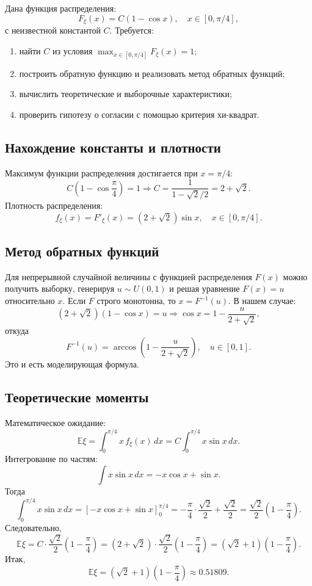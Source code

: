 \documentclass[bachelor, och, pract3]{SCWorks}
\begin{document}
Дана функция распределения:
\[
F_\xi(x) = C(1-\cos x), \quad x \in [0, \pi/4],
\]
с неизвестной константой $C$. Требуется:
\begin{enumerate}
    \item найти $C$ из условия $\max_{x \in [0, \pi/4]} F_\xi(x)=1$;
    \item построить обратную функцию и реализовать метод обратных функций;
    \item вычислить теоретические и выборочные характеристики;
    \item проверить гипотезу о согласии с помощью критерия хи-квадрат.
\end{enumerate}

\subsection{Нахождение константы и плотности}

Максимум функции распределения достигается при $x = \pi/4$:
\[
C\left(1-\cos\frac{\pi}{4}\right)=1 \Rightarrow C = \frac{1}{1-\sqrt{2}/2} = 2+\sqrt{2}.
\]
Плотность распределения:
\[
f_\xi(x) = F'_\xi(x) = (2+\sqrt{2})\sin x, \quad x\in[0,\pi/4].
\]

\subsection{Метод обратных функций}

Для непрерывной случайной величины с функцией распределения $F(x)$ можно получить выборку, генерируя $u\sim U(0,1)$ и решая уравнение $F(x)=u$ относительно $x$. Если $F$ строго монотонна, то $x = F^{-1}(u)$. В нашем случае:
\[
(2+\sqrt{2})(1-\cos x) = u \Rightarrow \cos x = 1 - \frac{u}{2+\sqrt{2}},
\]
откуда
\[
F^{-1}(u) = \arccos\left(1 - \frac{u}{2+\sqrt{2}}\right), \quad u\in[0,1].
\]
Это и есть моделирующая формула.

\subsection{Теоретические моменты}
Математическое ожидание:
\[
\mathbb E\xi=\int_0^{\pi/4} x\, f_\xi(x)\,dx
= C\int_0^{\pi/4} x\sin x\,dx.
\]
Интегрование по частям:
\[
\int x\sin x\,dx = -x\cos x+\sin x.
\]
Тогда
\[
\int_0^{\pi/4} x\sin x\,dx
= \left[-x\cos x+\sin x\right]_0^{\pi/4}
= -\frac{\pi}{4}\cdot\frac{\sqrt2}{2}+\frac{\sqrt2}{2}
= \frac{\sqrt2}{2}\left(1-\frac{\pi}{4}\right).
\]
Следовательно,
\[
\mathbb E\xi
= C\cdot \frac{\sqrt2}{2}\left(1-\frac{\pi}{4}\right)
= (2+\sqrt2)\cdot\frac{\sqrt2}{2}\left(1-\frac{\pi}{4}\right)
= (\sqrt2+1)\left(1-\frac{\pi}{4}\right).
\]
Итак,
\[
\mathbb E\xi=(\sqrt2+1)\left(1-\frac{\pi}{4}\right) \approx 0.51809.
\]
\end{document}
